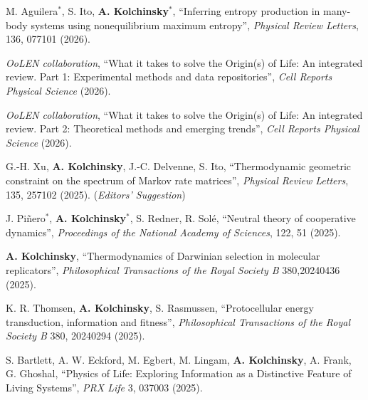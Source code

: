 M. Aguilera$^*$\CA, S. Ito, \textbf{A. Kolchinsky}$^*$\CA, ``Inferring entropy production in many-body systems using nonequilibrium maximum entropy'', \emph{Physical Review Letters}, 136, 077101 (2026).  

\emph{OoLEN collaboration}, ``What it takes to solve the Origin(s) of Life: An integrated review. Part 1: Experimental methods and data repositories'', \emph{Cell Reports Physical Science} (2026).  

\emph{OoLEN collaboration}, ``What it takes to solve the Origin(s) of Life: An integrated review. Part 2: Theoretical methods and emerging trends'', \emph{Cell Reports Physical Science} (2026).  

G.-H. Xu, \textbf{A. Kolchinsky}, J.-C. Delvenne, S. Ito, ``Thermodynamic geometric constraint on the spectrum of Markov rate matrices'', \emph{Physical Review Letters}, 135, 257102 (2025).   (\emph{Editors' Suggestion})%

J. Piñero$^*$, \textbf{A. Kolchinsky}$^*$, S. Redner, R. Solé, ``Neutral theory of cooperative dynamics'', \emph{Proceedings of the National Academy of Sciences}, 122, 51 (2025).   %

\textbf{A. Kolchinsky}, ``Thermodynamics of Darwinian selection in molecular replicators'', \emph{Philosophical Transactions of the Royal Society B} 380,20240436 (2025).  

K. R. Thomsen, \textbf{A. Kolchinsky}, S. Rasmussen, ``Protocellular energy transduction, information and fitness'', \emph{Philosophical Transactions of the Royal Society B} 380, 20240294 (2025).  

S. Bartlett, A. W. Eckford, M. Egbert, M. Lingam, \textbf{A. Kolchinsky}\CA, A. Frank\CA, G. Ghoshal\CA, ``Physics of Life: Exploring Information as a Distinctive Feature of Living Systems'', \emph{PRX Life} 3, 037003 (2025).    %

